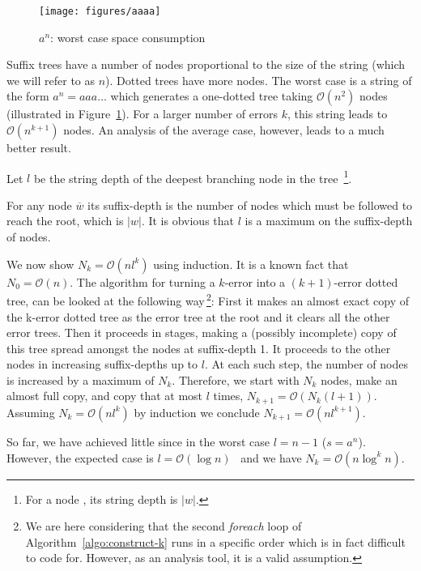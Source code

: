 \begin{figure}
\centering
\texttt{[image: figures/aaaa]}
\caption{$a^n$: worst case space consumption}%
\label{fig:aaaa}
\end{figure}

Suffix trees have a number of nodes proportional to the size of the string (which we will refer to as $n$). Dotted trees have more nodes. The worst case is a string of the form $a^n = aaa\dots$ which generates a one-dotted tree taking $\mathcal{O}(n^2)$ nodes (illustrated in Figure~\ref{fig:aaaa}). For a larger number of errors $k$, this string leads to $\mathcal{O}(n^{k+1})$ nodes. An analysis of the average case, however, leads to a much better result. 

\begin{definition}
Let $l$ be the string depth of the deepest branching node in the tree~\footnote{For a node \Node, its string depth is $|w|$.}.

For any node $\overline{w}$ its suffix-depth is the number of nodes which must be followed to reach the root, which is $|w|$. It is obvious that $l$ is a maximum on the suffix-depth of nodes.
\end{definition}

We now show $N_k = \mathcal{O}(nl^k)$ using induction. It is a known fact that $N_0 = \mathcal{O}(n)$. The algorithm for turning a $k$-error into a $(k+1)$-error dotted tree, can be looked at the following way\,\footnote{We are here considering that the second \textit{foreach} loop of Algorithm~\ref{algo:construct-k} runs in a specific order which is in fact difficult to code for. However, as an analysis tool, it is a valid assumption.}: First it makes an almost exact copy of the k-error dotted tree as the error tree at the root and it clears all the other error trees. Then it proceeds in stages, making a (possibly incomplete) copy of this tree spread amongst the nodes at suffix-depth 1. It proceeds to the other nodes in increasing suffix-depths up to $l$. At each such step, the number of nodes is increased by a maximum of $N_k$. Therefore, we start with $N_k$ nodes, make an almost full copy, and copy that at most $l$ times, $N_{k+1}=\mathcal{O}(N_k(l+1))$. Assuming $N_k=\mathcal{O}(nl^k)$ by induction we conclude $N_{k+1}=\mathcal{O}(nl^{k+1})$.

So far, we have achieved little since in the worst case $l=n-1$ ($s=a^n$). However, the expected case is $l=\mathcal{O}(\log n)$~\cite{apostolico92selfalignments,szpankowski:unexpected} and we have $N_k=\mathcal{O}(n\log^k n)$.
